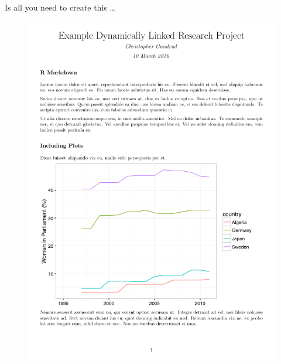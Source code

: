 \documentclass[10pt]{beamer}
\begin{document}
\begin{frame}{Is all you need to create this \ldots}

    \begin{figure}
            \includegraphics[scale=0.3]{img/rmarkdown_result.png}
    \end{figure}

\end{frame}
\end{document}

